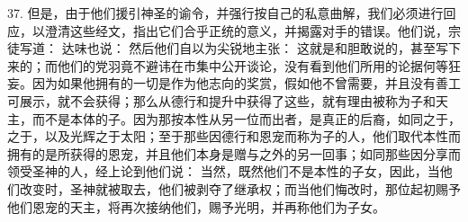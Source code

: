 37. 但是，由于他们援引神圣的谕令，并强行按自己的私意曲解，我们必须进行回应，以澄清这些经文，指出它们合乎正统的意义，并揭露对手的错误。他们说，宗徒写道： 达味也说： 然后他们自以为尖锐地主张： 这就是和胆敢说的，甚至写下来的；而他们的党羽竟不避讳在市集中公开谈论，没有看到他们所用的论据何等狂妄。因为如果他拥有的一切是作为他志向的奖赏，假如他不曾需要，并且没有善工可展示，就不会获得；那么从德行和提升中获得了这些，就有理由被称为子和天主，而不是本体的子。因为那按本性从另一位而出者，是真正的后裔，如同之于，之于，以及光辉之于太阳；至于那些因德行和恩宠而称为子的人，他们取代本性而拥有的是所获得的恩宠，并且他们本身是赠与之外的另一回事；如同那些因分享而领受圣神的人，经上论到他们说： 当然，既然他们不是本性的子女，因此，当他们改变时，圣神就被取去，他们被剥夺了继承权；而当他们悔改时，那位起初赐予他们恩宠的天主，将再次接纳他们，赐予光明，并再称他们为子女。\par

